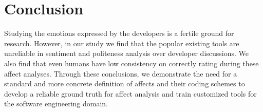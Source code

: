 \section{Conclusion}
Studying the emotions expressed by the developers is a fertile ground for research. However, in our study we find that the popular existing tools are unreliable in sentiment and politeness analysis over developer discussions. We also find that even humans have low consistency on correctly rating during these affect analyses. Through these conclusions, we demonstrate the need for a standard and more concrete definition of affects and their coding schemes to develop a reliable ground truth for affect analysis and train customized tools for the software engineering domain.  





